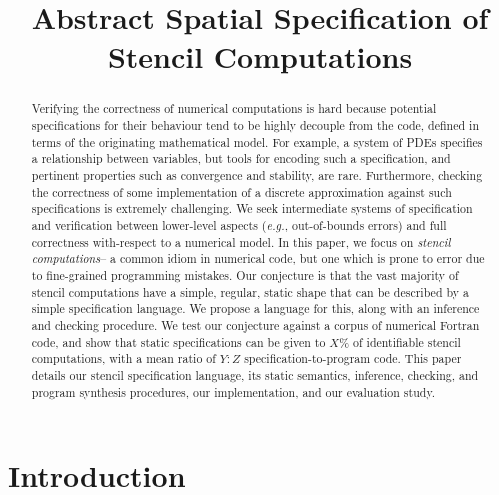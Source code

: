 \documentclass[9pt]{sigplanconf}
\title{Abstract Spatial Specification of Stencil Computations}
\theoremstyle{definition}
\newcommand{\eg}{\emph{e.g.}}
\begin{document}
\maketitle

\begin{abstract}
  Verifying the correctness of numerical computations is hard because
  potential specifications for their behaviour tend to be highly
  decouple from the code, defined in terms of the originating
  mathematical model. For example, a system of PDEs specifies a
  relationship between variables, but tools for encoding such a
  specification, and pertinent properties such as convergence and
  stability, are rare.  Furthermore, checking the correctness of some
  implementation of a discrete approximation against such
  specifications is extremely challenging. We seek intermediate
  systems of specification and verification between lower-level
  aspects (\eg{}, out-of-bounds errors) and full correctness
  with-respect to a numerical model. In this paper, we focus on
  \emph{stencil computations}-- a common idiom in numerical code, but
  one which is prone to error due to fine-grained programming
  mistakes.  Our conjecture is that the vast majority of stencil
  computations have a simple, regular, static shape that can be
  described by a simple specification language. We propose a language
  for this, along with an inference and checking procedure. We test
  our conjecture against a corpus of numerical Fortran code, and show
  that static specifications can be given to $X\%$ of identifiable
  stencil computations, with a mean ratio of $Y:Z$
  specification-to-program code. This paper details our stencil
  specification language, its static semantics, inference, checking,
  and program synthesis procedures, our implementation, and our
  evaluation study.
\end{abstract}




\section{Introduction}
\end{document}
